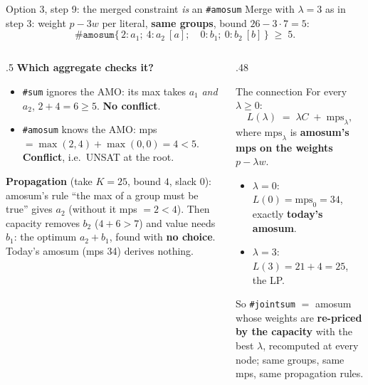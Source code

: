 \documentclass[aspectratio=169,11pt]{beamer}
\begin{document}
\begin{frame}{Option 3, step 9: the merged constraint \emph{is} an \texttt{\#amosum}}
\footnotesize
Merge with $\lambda = 3$ as in step 3: weight $p - 3w$ per literal, \textbf{same groups}, bound $26 - 3\cdot 7 = 5$:
\[
\#\texttt{amosum}\{\,2: a_1;\ 4: a_2\ [a];\quad 0: b_1;\ 0: b_2\ [b]\,\} \;\ge\; 5 .
\]
\begin{columns}[T]
\begin{column}{.5\textwidth}
\textbf{Which aggregate checks it?}
\begin{itemize}\setlength\itemsep{2pt}
\item \texttt{\#sum} ignores the AMO: its max takes $a_1$ \emph{and} $a_2$, $2+4 = 6 \ge 5$. \textbf{No conflict}.
\item \texttt{\#amosum} knows the AMO: mps $= \max(2,4) + \max(0,0) = 4 < 5$. \textbf{Conflict}, i.e.\ UNSAT at the root.
\end{itemize}
\textbf{Propagation} (take $K = 25$, bound $4$, slack 0):
amosum's rule ``the max of a group must be true'' gives $a_2$ (without it mps $= 2 < 4$). Then capacity removes $b_2$
($4+6 > 7$) and value needs $b_1$: the optimum $a_2 + b_1$, found with \textbf{no choice}. Today's amosum (mps 34) derives nothing.
\end{column}
\begin{column}{.48\textwidth}
\begin{block}{The connection}
For every $\lambda \ge 0$:
\[
L(\lambda) \;=\; \lambda C \;+\; \text{mps}_\lambda,
\]
where $\text{mps}_\lambda$ is \textbf{amosum's mps on the weights $p - \lambda w$}.
\begin{itemize}\setlength\itemsep{1pt}
\item $\lambda = 0$: $L(0) = \text{mps}_0 = 34$, exactly \textbf{today's amosum}.
\item $\lambda = 3$: $L(3) = 21 + 4 = 25$, the LP.
\end{itemize}
So \texttt{\#jointsum} $=$ amosum whose weights are \textbf{re-priced by the capacity} with the best $\lambda$, recomputed at
every node; same groups, same mps, same propagation rules.
\end{block}
\end{column}
\end{columns}
\end{frame}
\end{document}
